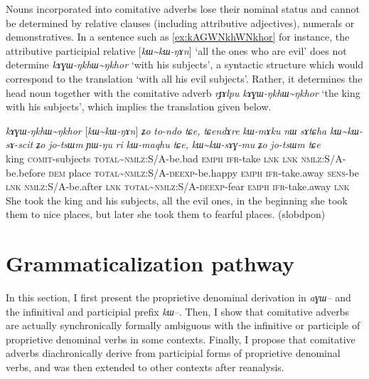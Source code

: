 \documentclass[oldfontcommands,oneside,a4paper,11pt]{article}
\newcommand{\ipa}[1]{{\phon\textit{#1}}} %
\newcommand{\tld}{\textasciitilde{}}
\begin{document}
Nouns incorporated into comitative adverbs lose their nominal status and cannot be determined by relative clauses (including attributive adjectives), numerals or demonstratives. In a sentence such as \ref{ex:kAGWNkhWNkhor} for instance, the attributive participial relative [\ipa{kɯ\tld{}kɯ-ŋɤn}] `all the ones who are evil' does not determine \ipa{kɤɣɯ-ŋkhɯ\tld{}ŋkhor} `with his subjects', a syntactic structure which would correspond to the translation `with all his evil subjects'. Rather, it determines the head noun together with the comitative adverb  \ipa{rɟɤlpu} \ipa{kɤɣɯ-ŋkhɯ\tld{}ŋkhor} `the king with his subjects', which implies the translation given below.

\begin{exe}
\ex \label{ex:kAGWNkhWNkhor}
\gll \ipa{rɟɤlpu}  	\ipa{kɤɣɯ-ŋkhɯ\tld{}ŋkhor}  	[\ipa{kɯ\tld{}kɯ-ŋɤn}]  	\ipa{ʑo}  	\ipa{to-ndo}  	\ipa{tɕe,}  	\ipa{tɕendɤre}  	\ipa{kɯ-mɤku}  	\ipa{nɯ}  	\ipa{sɤtɕha}  	\ipa{kɯ\tld{}kɯ-sɤ-scit}  	\ipa{ʑo}  	\ipa{jo-tsɯm}  	\ipa{ɲɯ-ŋu}  	\ipa{ri}  	\ipa{kɯ-maqhu}  	\ipa{tɕe,}  	\ipa{kɯ\tld{}kɯ-sɤɣ-mu}  	\ipa{ʑo}  	\ipa{jo-tsɯm}  	\ipa{tɕe}  \\
king \textsc{comit}-subjects \textsc{total}\tld{}\textsc{nmlz}:S/A-be.bad \textsc{emph} \textsc{ifr}-take \textsc{lnk}  \textsc{lnk} \textsc{nmlz}:S/A-be.before \textsc{dem} place \textsc{total}\tld{}\textsc{nmlz}:S/A-\textsc{deexp}-be.happy \textsc{emph} \textsc{ifr}-take.away \textsc{sens}-be \textsc{lnk} \textsc{nmlz}:S/A-be.after \textsc{lnk} \textsc{total}\tld{}\textsc{nmlz}:S/A-\textsc{deexp}-fear \textsc{emph} \textsc{ifr}-take.away \textsc{lnk} \\
\glt She took the king and his subjects, all the evil ones, in the beginning she took them to nice places, but later she took them to fearful places. (slobdpon)
\end{exe}


\section{Grammaticalization pathway} 
In this section, I first present the proprietive denominal derivation in \ipa{aɣɯ--} and the infinitival and participial prefix \ipa{kɯ--}. Then, I show that comitative adverbs are actually synchronically formally ambiguous with the infinitive or participle of proprietive denominal verbs in some contexts. Finally, I propose that comitative adverbs diachronically derive from participial forms of proprietive denominal verbs, and was then extended to other contexts after reanalysis.
\end{document}
